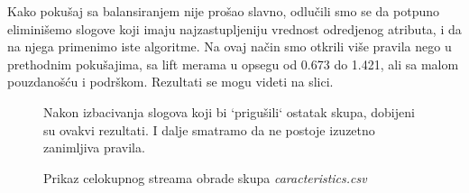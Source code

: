 \documentclass[a4paper,10pt]{article}
\begin{document}
Kako pokušaj sa balansiranjem nije prošao slavno, odlučili smo se da potpuno eliminišemo slogove koji imaju najzastupljeniju vrednost odredjenog atributa,
i da na njega primenimo iste algoritme. Na ovaj način smo otkrili više pravila nego u prethodnim pokušajima, sa lift merama 
u opsegu od 0.673 do 1.421, ali sa malom pouzdanošću i podrškom. Rezultati se mogu videti na slici.

\begin{figure}[!h]
 \centering
 \caption{Nakon izbacivanja slogova koji bi `prigušili` ostatak skupa, dobijeni su ovakvi rezultati. I dalje smatramo da ne 
 postoje izuzetno zanimljiva pravila. }
\end{figure}

\clearpage

\begin{figure}[h!]
 \centering
 \caption{Prikaz celokupnog streama obrade skupa \textit{caracteristics.csv} }
\end{figure}
\end{document}
